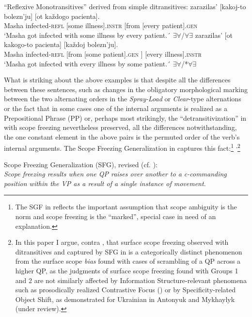 \documentclass[output=paper,colorlinks,citecolor=brown,nonflat]{./langscibook}
\begin{document}
\ea%
    \label{ex:antonyuk:7}
    “Reflexive Monotransitives” derived from simple ditransitives:
    \ea \label{ex:antonyuk:7a}
      {zarazilas’} {[kakoj-to} {bolezn’ju]} {[ot}      {každogo} {pacienta].}\\
    Masha infected-\textsc{refl}  [some illness].\textsc{instr} [from [every     patient].\textsc{gen}\\
    \glt `Masha got infected with some illness by every patient.´ \hfill ${\exists}{\forall}$/${\forall}{\exists}$
    \ex \label{ex:antonyuk:7b}
       {zarazilas’}          {[ot}      {kakogo-to} {pacienta]}      {} {[každoj} bolezn’ju].\\
    Masha infected-\textsc{refl}   [from [some         patient].\textsc{gen} ] [every illness].\textsc{instr}\\
    \glt `Masha got infected with every illness by some patient.´ \hfill ${\exists}{\forall}$/*${\forall}{\exists}$
    \z
\z

What is striking about the above examples is that despite all the differences between these sentences, such as changes in the obligatory morphological marking between the two alternating orders in the \textit{Spray-Load} or \textit{Clear}{}-type alternations or the fact that in some cases one of the internal arguments is realized as a Prepositional Phrase (PP) or, perhaps most strikingly, the “detransitivization” in  with scope freezing nevertheless preserved, all the differences notwithstanding, the one constant element in the above pairs is the permuted order of the verb’s internal arguments. The Scope Freezing Generalization in  captures this fact:\footnote{The SGF in  reflects the important assumption that scope ambiguity is the norm and scope freezing is the “marked”, special case in need of an explanation.} \textsuperscript{,}\footnote{In this paper I argue, contra \citet{Antonyuk2015}, that surface scope freezing observed with ditransitives and captured by SFG in  is a categorically distinct phenomenon from the surface scope \textit{bias} found with cases of scrambling of a QP across a higher QP, as the judgments of surface scope freezing found with Groups 1 and 2 are not similarly affected by Information Structure-relevant phenomena such as prosodically realized Contrastive Focus (\citealt{AntonyukLarson2016}) or by Specificity-related Object Shift, as demonstrated for Ukrainian in Antonyuk and Mykhaylyk (under review).}

\ea%
    \label{ex:antonyuk:8}
    Scope Freezing Generalization (SFG), revised (cf. \citealt{Antonyuk2015}):\\
    \textit{Scope freezing results when one QP raises over another to a c-commanding position within the VP as a result of a single instance of movement.}
    \z
\end{document}
